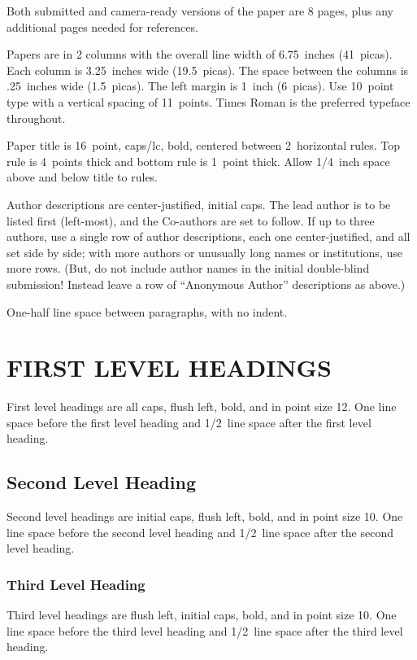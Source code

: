 \documentclass[twoside]{article}
\begin{document}
Both submitted and camera-ready versions of the paper are 8 pages,
plus any additional pages needed for references.

Papers are in 2 columns with the overall line width of 6.75~inches (41~picas). Each column is 3.25~inches wide (19.5~picas).  The space
between the columns is .25~inches wide (1.5~picas).  The left margin is 1~inch (6~picas).  Use 10~point type with a vertical spacing of
11~points. Times Roman is the preferred typeface throughout.

Paper title is 16~point, caps/lc, bold, centered between 2~horizontal rules.  Top rule is 4~points thick and bottom rule is 1~point thick.
Allow 1/4~inch space above and below title to rules.

Author descriptions are center-justified, initial caps.  The lead
author is to be listed first (left-most), and the Co-authors are set
to follow.  If up to three authors, use a single row of author
descriptions, each one center-justified, and all set side by side;
with more authors or unusually long names or institutions, use more
rows.  (But, do not include author names in the initial double-blind
submission!  Instead leave a row of ``Anonymous Author'' descriptions
as above.)


One-half line space between paragraphs, with no indent.

\section{FIRST LEVEL HEADINGS}

First level headings are all caps, flush left, bold, and in point size
12. One line space before the first level heading and 1/2~line space
after the first level heading.

\subsection{Second Level Heading}

Second level headings are initial caps, flush left, bold, and in point
size 10. One line space before the second level heading and 1/2~line
space after the second level heading.

\subsubsection{Third Level Heading}

Third level headings are flush left, initial caps, bold, and in point
size 10. One line space before the third level heading and 1/2~line
space after the third level heading.
\end{document}
